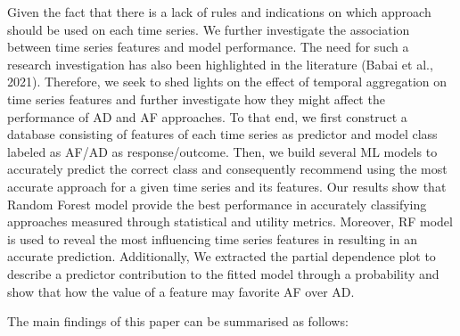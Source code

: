 \documentclass[]{elsarticle} %
\begin{document}
Given the fact that there is a lack of rules and indications on which
approach should be used on each time series. We further investigate the
association between time series features and model performance. The need
for such a research investigation has also been highlighted in the
literature (Babai et al., 2021). Therefore, we seek to shed lights on
the effect of temporal aggregation on time series features and further
investigate how they might affect the performance of AD and AF
approaches. To that end, we first construct a database consisting of
features of each time series as predictor and model class labeled as
AF/AD as response/outcome. Then, we build several ML models to
accurately predict the correct class and consequently recommend using
the most accurate approach for a given time series and its features. Our
results show that Random Forest model provide the best performance in
accurately classifying approaches measured through statistical and
utility metrics. Moreover, RF model is used to reveal the most
influencing time series features in resulting in an accurate prediction.
Additionally, We extracted the partial dependence plot to describe a
predictor contribution to the fitted model through a probability and
show that how the value of a feature may favorite AF over AD.

The main findings of this paper can be summarised as follows:
\end{document}
